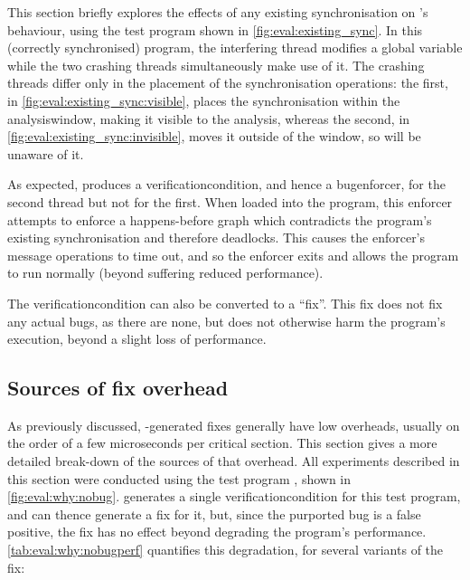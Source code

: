 \noindent
This section briefly explores the effects of any existing
synchronisation on {\technique}'s behaviour, using the test program
shown in \autoref{fig:eval:existing_sync}.  In this (correctly
synchronised) program, the interfering thread modifies a global
variable while the two crashing threads simultaneously make use of it.
The crashing threads differ only in the placement of the
synchronisation operations: the first, in
\autoref{fig:eval:existing_sync:visible}, places the synchronisation
within the \gls{analysiswindow}, making it visible to the {\technique}
analysis, whereas the second, in
\autoref{fig:eval:existing_sync:invisible}, moves it outside of the
window, so {\technique} will be unaware of it.

As expected, {\technique} produces a \gls{verificationcondition}, and
hence a \gls{bugenforcer}, for the second thread but not for the
first.  When loaded into the program, this enforcer attempts to
enforce a happens-before graph which contradicts the program's
existing synchronisation and therefore deadlocks.  This causes the
enforcer's message operations to time out, and so the enforcer exits
and allows the program to run normally (beyond suffering reduced
performance).

The \gls{verificationcondition} can also be converted to a ``fix''.
This fix does not fix any actual bugs, as there are none, but does not
otherwise harm the program's execution, beyond a slight loss of
performance.

\subsection{Sources of fix overhead}
\label{sect:eval:why:fix_overhead}

As previously discussed, {\technique}-generated fixes generally have
low overheads, usually on the order of a few microseconds per critical
section.  This section gives a more detailed break-down of the sources
of that overhead.  All experiments described in this section were
conducted using the test program , shown in
\autoref{fig:eval:why:nobug}.  {\Technique} generates a single
\gls{verificationcondition} for this test program, and can thence
generate a fix for it, but, since the purported bug is a false
positive, the fix has no effect beyond degrading the program's
performance.  \autoref{tab:eval:why:nobugperf} quantifies this
degradation, for several variants of the fix:


